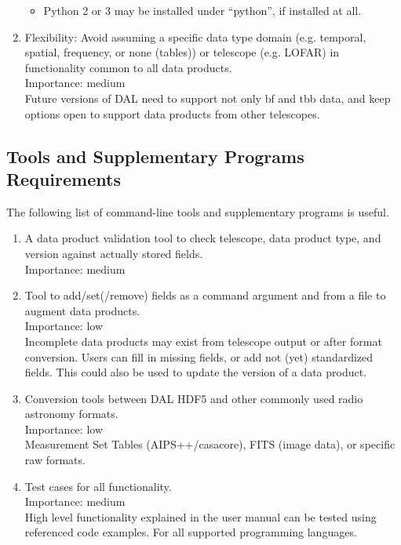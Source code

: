 \documentclass[a4paper,11pt]{article}
\begin{document}
\begin{enumerate}[resume, label=\it R.\arabic{*}]
\begin{itemize}
\item Python 2 or 3 may be installed under ``python'', if installed at all.\\
\end{itemize}

\item \label{req:flex} Flexibility: Avoid assuming a specific data type domain (e.g. temporal, spatial, frequency, or none (tables)) or telescope (e.g. LOFAR) in functionality common to all data products.\\
Importance: medium\\
Future versions of DAL need to support not only bf and tbb data, and keep options open to support data products from other telescopes.

\end{enumerate}


\subsection{Tools and Supplementary Programs Requirements} \label{sec:tools_and_suppl_program_seqs}
The following list of command-line tools and supplementary programs is useful.
\begin{enumerate}[resume, label=\it R.\arabic{*}]
\itemsep0em

\item \label{req:data_prod_valid} A data product validation tool to check telescope, data product type, and version against actually stored fields.\\
Importance: medium\\

\item \label{req:add_fields} Tool to add/set(/remove) fields as a command argument and from a file to augment data products.\\
Importance: low\\
Incomplete data products may exist from telescope output or after format conversion.
Users can fill in missing fields, or add not (yet) standardized fields.
This could also be used to update the version of a data product.

\item \label{req:conv} Conversion tools between DAL HDF5 and other commonly used radio astronomy formats.\\
Importance: low\\
Measurement Set Tables (AIPS++/casacore), FITS (image data), or specific raw formats.

\item \label{req:tests} Test cases for all functionality.\\
Importance: medium\\
High level functionality explained in the user manual can be tested using referenced code examples.
For all supported programming languages.

\end{enumerate}
\end{document}
